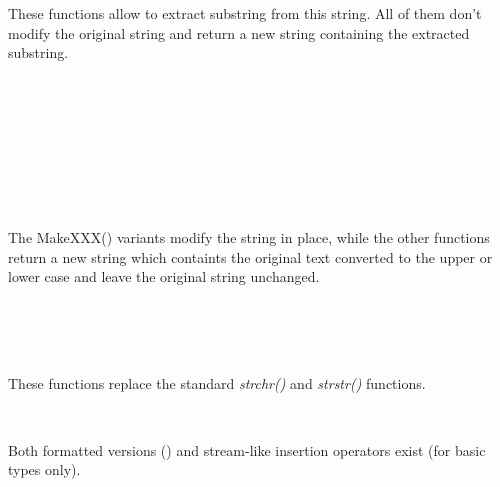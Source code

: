 
These functions allow to extract substring from this string. All of them don't
modify the original string and return a new string containing the extracted
substring.

\\
\\
\\
\\
\\
\\
\\


The MakeXXX() variants modify the string in place, while the other functions
return a new string which containts the original text converted to the upper or
lower case and leave the original string unchanged.

\\
\\
\\


These functions replace the standard {\it strchr()} and {\it strstr()}
functions.

\\


Both formatted versions () and stream-like
insertion operators exist (for basic types only).

